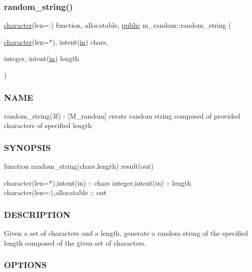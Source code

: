 \subsubsection{\texorpdfstring{random\+\_\+string()}{random\_string()}}
{\footnotesize\ttfamily \hyperlink{option__stopwatch_83_8txt_abd4b21fbbd175834027b5224bfe97e66}{character}(len=\+:) function, allocatable, \hyperlink{M__stopwatch_83_8txt_a2f74811300c361e53b430611a7d1769f}{public} m\+\_\+random\+::random\+\_\+string (\begin{DoxyParamCaption}\item[{\hyperlink{option__stopwatch_83_8txt_abd4b21fbbd175834027b5224bfe97e66}{character}(len=$\ast$), intent(\hyperlink{M__journal_83_8txt_afce72651d1eed785a2132bee863b2f38}{in})}]{chars,  }\item[{integer, intent(\hyperlink{M__journal_83_8txt_afce72651d1eed785a2132bee863b2f38}{in})}]{length }\end{DoxyParamCaption})}



\subsubsection*{N\+A\+ME}

random\+\_\+string(3f) -\/ \mbox{[}M\+\_\+random\mbox{]} create random string composed of provided characters of specified length 

\subsubsection*{S\+Y\+N\+O\+P\+S\+IS}

\begin{DoxyVerb}function random_string(chars,length) result(out)

 character(len=*),intent(in)     :: chars
 integer,intent(in)              :: length
 character(len=:),allocatable    :: out
\end{DoxyVerb}


\subsubsection*{D\+E\+S\+C\+R\+I\+P\+T\+I\+ON}

Given a set of characters and a length, generate a random string of the specified length composed of the given set of characters.

\subsubsection*{O\+P\+T\+I\+O\+NS}

